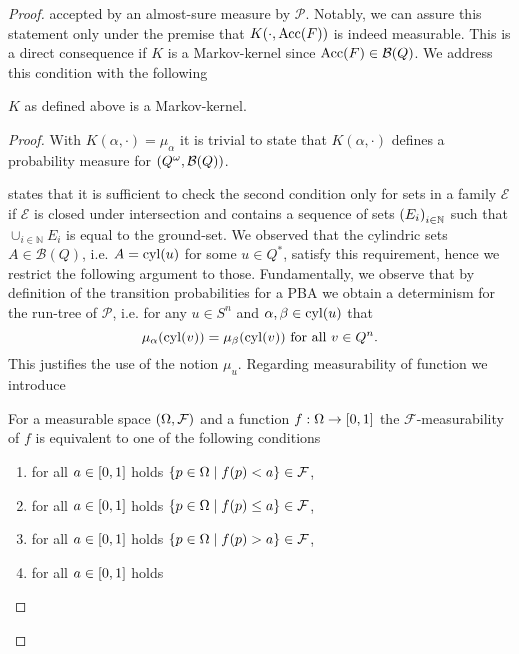 \begin{proof}
  accepted by an almost-sure measure by $\mathcal{P}$. Notably, we can assure 
  this statement only under the premise that $K(\cdot, \operatorname{Acc}(F))$ is indeed 
  measurable. This is a direct consequence if $K$ is a Markov-kernel since 
  $\operatorname{Acc}(F)\in\mathcal{B}(Q)$. We address this condition with the following
  \begin{lemma}
    $K$ as defined above is a Markov-kernel.
  \end{lemma}
  \begin{proof}
    With $K(\alpha,\cdot) = \mu_{\alpha}$ it is trivial to state that 
    $K(\alpha,\cdot)$ defines a probability measure for 
    $\left(Q^{\omega},\mathcal{B}(Q)\right)$.

    \cite[Remark 8.26]{Klenke} states that it is sufficient to check the second 
    condition only for sets in a family $\mathcal{E}$ if $\mathcal{E}$ is 
    closed under intersection and contains a sequence of sets 
    $\left(E_{i}\right)_{i\in\mathbb{N}}$ such that $\cup_{i\in\mathbb{N}}E_{i}$ is
    equal to the ground-set. We observed that the cylindric sets 
    $A\in\mathcal{B}(Q)$, i.e. $A = \operatorname{cyl}(u)$ for some $u\in Q^{*}$, satisfy 
    this requirement, hence we restrict the following argument to those.
    Fundamentally, we observe that by definition of the transition 
    probabilities for a \ac{PBA} we obtain a determinism for the run-tree of 
    $\mathcal{P}$, i.e. for any $u\in S^{n}$ and $\alpha, \beta\in\operatorname{cyl}(u)$ that
    \begin{equation*}
      \mu_{\alpha}(\operatorname{cyl}(v)) = \mu_{\beta}(\operatorname{cyl}(v))\text{ for all }v\in Q^{n}.
    \end{equation*}
    This justifies the use of the notion $\mu_{u}$.  Regarding measurability of 
    function we introduce
    \begin{theorem}
      \cite[Theorem 9.2]{Bauer}
      For a measurable space $\left(\Omega, \mathcal{F}\right)$ and a function 
      $f:\Omega\rightarrow\left[0,1\right]$ the $\mathcal{F}$-measurability of
      $f$ is equivalent to one of the following conditions
      \begin{enumerate}
        \item for all $a\in\left[0,1\right]$ holds 
          $\left\{p\in\Omega\mid f(p) < a\right\}\in\mathcal{F}$,
        \item for all $a\in\left[0,1\right]$ holds 
          $\left\{p\in\Omega\mid f(p) \leq a\right\}\in\mathcal{F}$,
        \item for all $a\in\left[0,1\right]$ holds 
          $\left\{p\in\Omega\mid f(p) > a\right\}\in\mathcal{F}$,
        \item for all $a\in\left[0,1\right]$ holds 

\end{enumerate}
\end{theorem}
\end{proof}
\end{proof}
